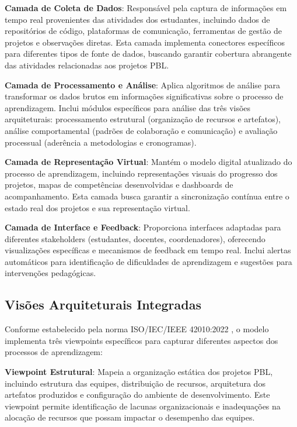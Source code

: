 \documentclass[12pt,a4paper]{article}
\begin{document}
\textbf{Camada de Coleta de Dados}: Responsável pela captura de informações em tempo real provenientes das atividades dos estudantes, incluindo dados de repositórios de código, plataformas de comunicação, ferramentas de gestão de projetos e observações diretas. Esta camada implementa conectores específicos para diferentes tipos de fonte de dados, buscando garantir cobertura abrangente das atividades relacionadas aos projetos PBL.

\textbf{Camada de Processamento e Análise}: Aplica algoritmos de análise para transformar os dados brutos em informações significativas sobre o processo de aprendizagem. Inclui módulos específicos para análise das três visões arquiteturais: processamento estrutural (organização de recursos e artefatos), análise comportamental (padrões de colaboração e comunicação) e avaliação processual (aderência a metodologias e cronogramas).

\textbf{Camada de Representação Virtual}: Mantém o modelo digital atualizado do processo de aprendizagem, incluindo representações visuais do progresso dos projetos, mapas de competências desenvolvidas e dashboards de acompanhamento. Esta camada busca garantir a sincronização contínua entre o estado real dos projetos e sua representação virtual.

\textbf{Camada de Interface e Feedback}: Proporciona interfaces adaptadas para diferentes stakeholders (estudantes, docentes, coordenadores), oferecendo visualizações específicas e mecanismos de feedback em tempo real. Inclui alertas automáticos para identificação de dificuldades de aprendizagem e sugestões para intervenções pedagógicas.

\subsection{Visões Arquiteturais Integradas}

Conforme estabelecido pela norma ISO/IEC/IEEE 42010:2022 \cite{iso42010}, o modelo implementa três viewpoints específicos para capturar diferentes aspectos dos processos de aprendizagem:

\textbf{Viewpoint Estrutural}: Mapeia a organização estática dos projetos PBL, incluindo estrutura das equipes, distribuição de recursos, arquitetura dos artefatos produzidos e configuração do ambiente de desenvolvimento. Este viewpoint permite identificação de lacunas organizacionais e inadequações na alocação de recursos que possam impactar o desempenho das equipes.
\end{document}

